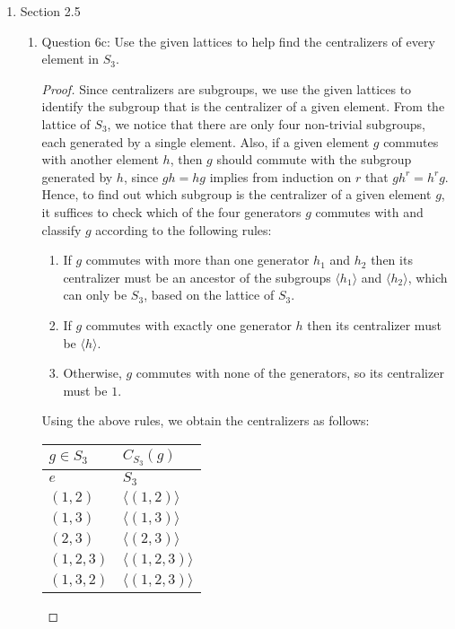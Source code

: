 \documentclass{article}
\begin{document}
\begin{enumerate}
  \item Section 2.5
    \begin{enumerate}
      \item Question 6c: Use the given lattices to help find the
        centralizers of every element in $S_3$.
        \begin{proof}
          Since centralizers are subgroups, we use the given lattices to
          identify the subgroup that is the centralizer of a given element.
          From the lattice of $S_3$, we notice that there are only four
          non-trivial subgroups, each generated by a single element. Also,
          if a given element $g$ commutes with another element $h$, then
          $g$ should commute with the subgroup generated by $h$, since
          $gh=hg$ implies from induction on $r$ that $gh^r=h^rg$. Hence, to
          find out which subgroup is the centralizer of a given element
          $g$, it suffices to check which of the four generators $g$
          commutes with and classify $g$ according to the following rules:
          \begin{enumerate}
            \item If $g$ commutes with more than one generator $h_1$ and
              $h_2$ then its centralizer must be an ancestor of the
              subgroups $\langle h_1\rangle$ and $\langle h_2\rangle$,
              which can only be $S_3$, based on the lattice of $S_3$.
            \item If $g$ commutes with exactly one generator $h$ then its
              centralizer must be $\langle h\rangle$.
            \item Otherwise, $g$ commutes with none of the generators, so
              its centralizer must be $1$.
          \end{enumerate}

          Using the above rules, we obtain the centralizers as follows:
          \begin{center}
            \begin{tabular}{|l|l|}
              \hline
              $g\in S_3$  & $C_{S_3}(g)$              \\ \hline\hline
              $e$         & $S_3$                     \\ \hline
              $(1,2)$     & $\langle(1,2)\rangle$     \\ \hline
              $(1,3)$     & $\langle(1,3)\rangle$     \\ \hline
              $(2,3)$     & $\langle(2,3)\rangle$     \\ \hline
              $(1,2,3)$   & $\langle(1,2,3)\rangle$   \\ \hline
              $(1,3,2)$   & $\langle(1,2,3)\rangle$   \\ \hline
            \end{tabular}
          \end{center}
        \end{proof}
    \end{enumerate}
\end{enumerate}
\end{document}
